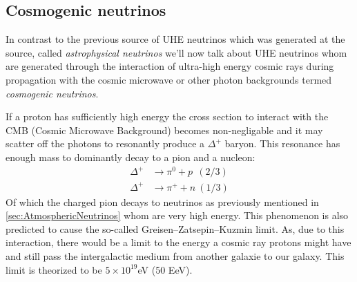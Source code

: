 \subsection{Cosmogenic neutrinos}
In contrast to the previous source of UHE neutrinos which was generated at the
source, called \textit{astrophysical neutrinos} we'll now talk about UHE
neutrinos whom are generated through the interaction of ultra-high energy
cosmic rays during propagation with the cosmic microwave or other photon
backgrounds termed \textit{cosmogenic neutrinos}.  

If a proton has sufficiently high energy the cross
section to interact with the CMB (Cosmic Microwave Background) becomes
non-negligable and it may scatter off the photons to
resonantly produce a $\Delta^+$ baryon.  This resonance has enough mass to
dominantly decay to a pion and a nucleon\cite{M_ller_2019}:
\begin{align}
	\Delta^+ &\rightarrow \pi^0 + p \ \ (2/3)\\
	\Delta^+ &\rightarrow \pi^+ + n \ (1/3)
\end{align}
Of which the charged pion decays to neutrinos as previously mentioned in 
\ref{sec:AtmosphericNeutrinos} whom are very high energy.
This phenomenon is also predicted to cause the so-called Greisen–Zatsepin–Kuzmin\cite{Zatsepin}\cite{Greisen} 
limit. As, due to this interaction, there would be a limit to the energy a cosmic ray protons might have
and still pass the intergalactic medium from another galaxie to our galaxy. This limit is theorized to be
$5\times10^{19}$eV (50 EeV). 
